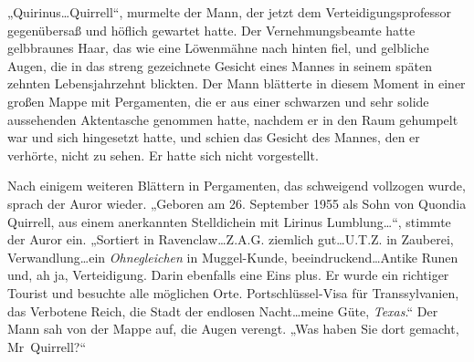 „Quirinus…Quirrell“, murmelte der Mann, der jetzt dem Verteidigungsprofessor gegenübersaß und höflich gewartet hatte. Der Vernehmungsbeamte hatte gelbbraunes Haar, das wie eine Löwenmähne nach hinten fiel, und gelbliche Augen, die in das streng gezeichnete Gesicht eines Mannes in seinem späten zehnten Lebensjahrzehnt blickten. Der Mann blätterte in diesem Moment in einer großen Mappe mit Pergamenten, die er aus einer schwarzen und sehr solide aussehenden Aktentasche genommen hatte, nachdem er in den Raum gehumpelt war und sich hingesetzt hatte, und schien das Gesicht des Mannes, den er verhörte, nicht zu sehen. Er hatte sich nicht vorgestellt.

Nach einigem weiteren Blättern in Pergamenten, das schweigend vollzogen wurde, sprach der Auror wieder.
„Geboren am 26. September 1955 als Sohn von Quondia Quirrell, aus einem anerkannten Stelldichein mit Lirinus Lumblung…“, stimmte der Auror ein.
„Sortiert in Ravenclaw…Z.A.G. ziemlich gut…U.T.Z. in Zauberei, Verwandlung…ein \emph{Ohnegleichen} in Muggel-Kunde, beeindruckend…Antike Runen und, ah ja, Verteidigung. Darin ebenfalls eine Eins plus. Er wurde ein richtiger Tourist und besuchte alle möglichen Orte. Portschlüssel-Visa für Transsylvanien, das Verbotene Reich, die Stadt der endlosen Nacht…meine Güte, \emph{Texas}.“
Der Mann sah von der Mappe auf, die Augen verengt.
„Was haben Sie dort gemacht, Mr~Quirrell?“

